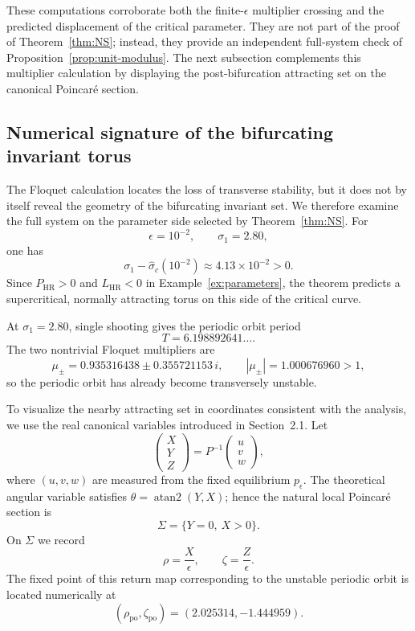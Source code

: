 \documentclass[11pt]{amsart}
\theoremstyle{remark}
\newcommand{\PHR}{P_{\mathrm{HR}}}
\newcommand{\LHR}{L_{\mathrm{HR}}}
\begin{document}
These computations corroborate both the finite-\(\epsilon\) multiplier
crossing and the predicted displacement of the critical parameter.  They
are not part of the proof of Theorem~\ref{thm:NS}; instead, they provide an
independent full-system check of Proposition~\ref{prop:unit-modulus}.  The next subsection complements
this multiplier calculation by displaying the post-bifurcation attracting
set on the canonical Poincar\'e section.


\subsection{Numerical signature of the bifurcating invariant torus}
\label{subsec:torus-validation}

The Floquet calculation locates the loss of transverse stability, but it
does not by itself reveal the geometry of the bifurcating invariant set.
We therefore examine the full system on the parameter side selected by
Theorem~\ref{thm:NS}.  For
\[
 \epsilon=10^{-2},\qquad \sigma_1=2.80,
\]
one has
\[
 \sigma_1-\widehat{\sigma}_c(10^{-2})
 \approx 4.13\times10^{-2}>0.
\]
Since \(\PHR>0\) and \(\LHR<0\) in Example~\ref{ex:parameters},
the theorem predicts a supercritical, normally attracting torus on this
side of the critical curve.

At \(\sigma_1=2.80\), single shooting gives the periodic orbit period
\[
 T=6.198892641\ldots .
\]
The two nontrivial Floquet multipliers are
\[
 \mu_\pm
 =0.935316438\pm0.355721153\,i,
 \qquad
 |\mu_\pm|=1.000676960>1,
\]
so the periodic orbit has already become transversely unstable.

To visualize the nearby attracting set in coordinates consistent with the
analysis, we use the real canonical variables introduced in
Section~2.1.  Let
\[
 \begin{pmatrix}X\\Y\\Z\end{pmatrix}
 =
 P^{-1}
 \begin{pmatrix}u\\v\\w\end{pmatrix},
\]
where \((u,v,w)\) are measured from the fixed equilibrium
\(p_\epsilon\).  The theoretical angular variable satisfies
\(\theta=\operatorname{atan2}(Y,X)\); hence the natural local Poincar\'e
section is
\[
 \Sigma=\{Y=0,\ X>0\}.
\]
On \(\Sigma\) we record
\[
 \rho=\frac{X}{\epsilon},
 \qquad
 \zeta=\frac{Z}{\epsilon}.
\]
The fixed point of this return map corresponding to the unstable periodic
orbit is located numerically at
\[
 (\rho_{\mathrm{po}},\zeta_{\mathrm{po}})
 =(2.025314,-1.444959).
\]
\end{document}
